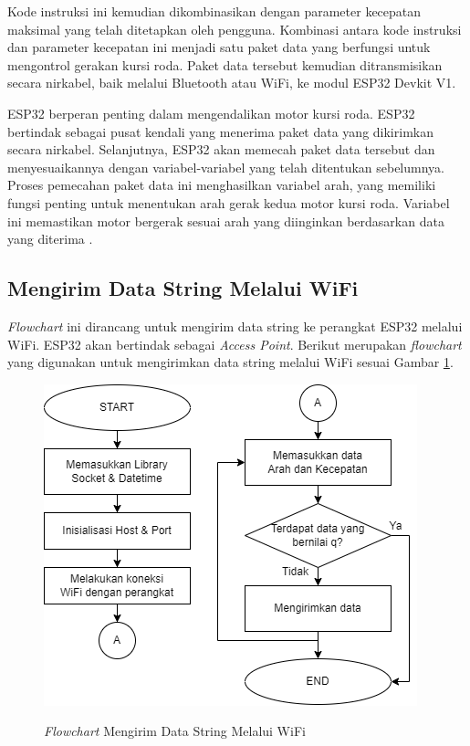 Kode instruksi ini kemudian dikombinasikan dengan parameter kecepatan maksimal yang telah ditetapkan oleh pengguna. Kombinasi antara kode instruksi dan parameter kecepatan ini menjadi satu paket data yang berfungsi untuk mengontrol gerakan kursi roda. Paket data tersebut kemudian ditransmisikan secara nirkabel, baik melalui Bluetooth atau WiFi, ke modul ESP32 Devkit V1.

ESP32 berperan penting dalam mengendalikan motor kursi roda. ESP32 bertindak sebagai pusat kendali yang menerima paket data yang dikirimkan secara nirkabel. Selanjutnya, ESP32 akan memecah paket data tersebut dan menyesuaikannya dengan variabel-variabel yang telah ditentukan sebelumnya. Proses pemecahan paket data ini menghasilkan variabel arah, yang memiliki fungsi penting untuk menentukan arah gerak kedua motor kursi roda. Variabel ini memastikan motor bergerak sesuai arah yang diinginkan berdasarkan data yang diterima \parencite{ekatama2024perancangan}.

\subsection{Mengirim Data String Melalui WiFi}

\emph{Flowchart} ini dirancang untuk mengirim data string ke perangkat ESP32 melalui WiFi. ESP32 akan bertindak sebagai \emph{Access Point}. Berikut merupakan \emph{flowchart} yang digunakan untuk mengirimkan data string melalui WiFi sesuai Gambar \ref{fig:Flowchart 10 Mengirim String WiFi}.

\begin{figure} [H] \centering
  \includegraphics[scale=0.55]{gambar/bab3/10. Mengirim Data String WiFi.png}
  \caption{\emph{Flowchart} Mengirim Data String Melalui WiFi}
  \label{fig:Flowchart 10 Mengirim String WiFi}
  \parencite{ekatama2024perancangan}
\end{figure}

